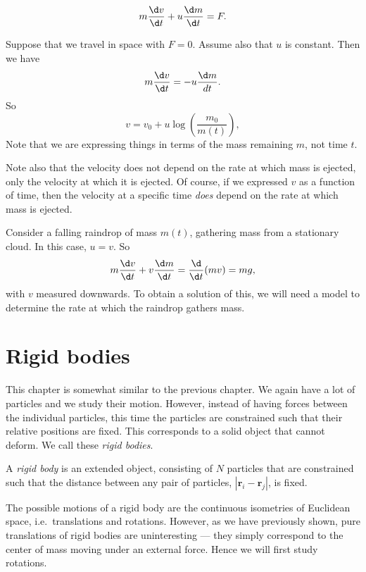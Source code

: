 \documentclass[a4paper]{article}
\begin{document}
\begin{prop}
  \[
    m\frac{\d v}{\d t} + u\frac{\d m}{\d t} = F.
  \]
\end{prop}
\begin{eg}
  Suppose that we travel in space with $F = 0$. Assume also that $u$ is constant. Then we have
  \[
    m\frac{\d v}{\d t} = -u\frac{\d m}{d t}.
  \]
  So
  \[
    v = v_0 + u \log \left(\frac{m_0}{m(t)}\right),
  \]
  Note that we are expressing things in terms of the mass remaining $m$, not time $t$.

  Note also that the velocity does not depend on the rate at which mass is ejected, only the velocity at which it is ejected. Of course, if we expressed $v$ as a function of time, then the velocity at a specific time \emph{does} depend on the rate at which mass is ejected.
\end{eg}

\begin{eg}
  Consider a falling raindrop of mass $m(t)$, gathering mass from a stationary cloud. In this case, $u = v$. So
  \[
    m\frac{\d v}{\d t} + v\frac{\d m}{\d t} = \frac{\d }{\d t}(mv) = mg,
  \]
  with $v$ measured downwards. To obtain a solution of this, we will need a model to determine the rate at which the raindrop gathers mass.
\end{eg}

\section{Rigid bodies}
This chapter is somewhat similar to the previous chapter. We again have a lot of particles and we study their motion. However, instead of having forces between the individual particles, this time the particles are constrained such that their relative positions are fixed. This corresponds to a solid object that cannot deform. We call these \emph{rigid bodies}.

\begin{defi}
  A \emph{rigid body} is an extended object, consisting of $N$ particles that are constrained such that the distance between any pair of particles, $|\mathbf{r}_i - \mathbf{r}_j|$, is fixed.
\end{defi}

The possible motions of a rigid body are the continuous isometries of Euclidean space, i.e.\ translations and rotations. However, as we have previously shown, pure translations of rigid bodies are uninteresting --- they simply correspond to the center of mass moving under an external force. Hence we will first study rotations.
\end{document}
